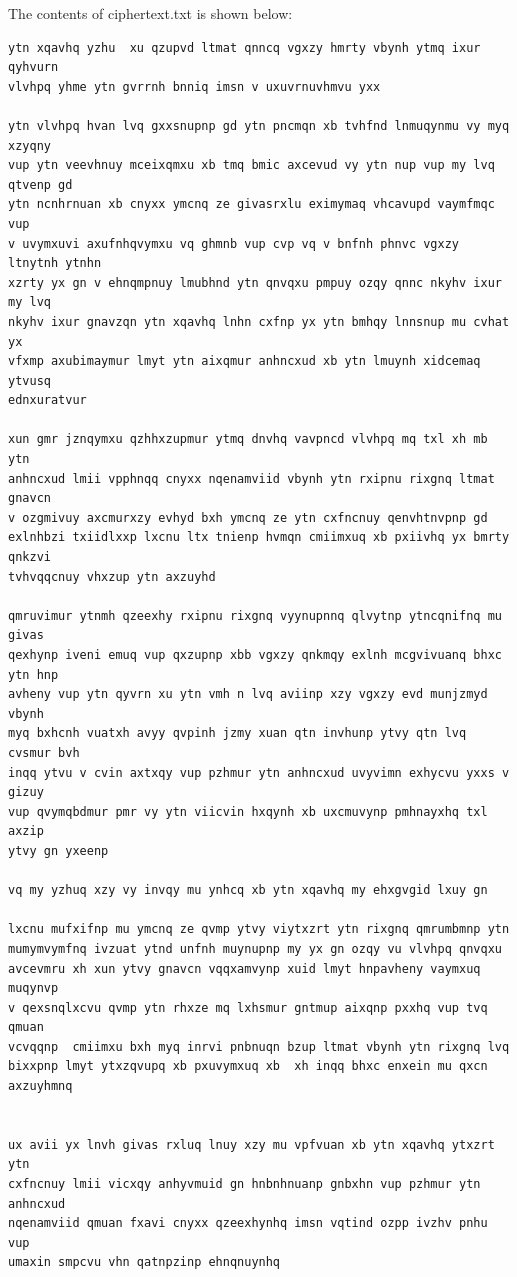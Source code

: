 \documentclass[12pt]{article}
\begin{document}
The contents of ciphertext.txt is shown below:
\begin{verbatim}
ytn xqavhq yzhu  xu qzupvd ltmat qnncq vgxzy hmrty vbynh ytmq ixur qyhvurn
vlvhpq yhme ytn gvrrnh bnniq imsn v uxuvrnuvhmvu yxx

ytn vlvhpq hvan lvq gxxsnupnp gd ytn pncmqn xb tvhfnd lnmuqynmu vy myq xzyqny
vup ytn veevhnuy mceixqmxu xb tmq bmic axcevud vy ytn nup vup my lvq qtvenp gd
ytn ncnhrnuan xb cnyxx ymcnq ze givasrxlu eximymaq vhcavupd vaymfmqc vup
v uvymxuvi axufnhqvymxu vq ghmnb vup cvp vq v bnfnh phnvc vgxzy ltnytnh ytnhn
xzrty yx gn v ehnqmpnuy lmubhnd ytn qnvqxu pmpuy ozqy qnnc nkyhv ixur my lvq
nkyhv ixur gnavzqn ytn xqavhq lnhn cxfnp yx ytn bmhqy lnnsnup mu cvhat yx
vfxmp axubimaymur lmyt ytn aixqmur anhncxud xb ytn lmuynh xidcemaq ytvusq
ednxuratvur

xun gmr jznqymxu qzhhxzupmur ytmq dnvhq vavpncd vlvhpq mq txl xh mb ytn
anhncxud lmii vpphnqq cnyxx nqenamviid vbynh ytn rxipnu rixgnq ltmat gnavcn
v ozgmivuy axcmurxzy evhyd bxh ymcnq ze ytn cxfncnuy qenvhtnvpnp gd 
exlnhbzi txiidlxxp lxcnu ltx tnienp hvmqn cmiimxuq xb pxiivhq yx bmrty qnkzvi
tvhvqqcnuy vhxzup ytn axzuyhd

qmruvimur ytnmh qzeexhy rxipnu rixgnq vyynupnnq qlvytnp ytncqnifnq mu givas
qexhynp iveni emuq vup qxzupnp xbb vgxzy qnkmqy exlnh mcgvivuanq bhxc ytn hnp
avheny vup ytn qyvrn xu ytn vmh n lvq aviinp xzy vgxzy evd munjzmyd vbynh
myq bxhcnh vuatxh avyy qvpinh jzmy xuan qtn invhunp ytvy qtn lvq cvsmur bvh
inqq ytvu v cvin axtxqy vup pzhmur ytn anhncxud uvyvimn exhycvu yxxs v gizuy
vup qvymqbdmur pmr vy ytn viicvin hxqynh xb uxcmuvynp pmhnayxhq txl axzip
ytvy gn yxeenp

vq my yzhuq xzy vy invqy mu ynhcq xb ytn xqavhq my ehxgvgid lxuy gn

lxcnu mufxifnp mu ymcnq ze qvmp ytvy viytxzrt ytn rixgnq qmrumbmnp ytn
mumymvymfnq ivzuat ytnd unfnh muynupnp my yx gn ozqy vu vlvhpq qnvqxu
avcevmru xh xun ytvy gnavcn vqqxamvynp xuid lmyt hnpavheny vaymxuq muqynvp
v qexsnqlxcvu qvmp ytn rhxze mq lxhsmur gntmup aixqnp pxxhq vup tvq qmuan
vcvqqnp  cmiimxu bxh myq inrvi pnbnuqn bzup ltmat vbynh ytn rixgnq lvq
bixxpnp lmyt ytxzqvupq xb pxuvymxuq xb  xh inqq bhxc enxein mu qxcn 
axzuyhmnq


ux avii yx lnvh givas rxluq lnuy xzy mu vpfvuan xb ytn xqavhq ytxzrt ytn
cxfncnuy lmii vicxqy anhyvmuid gn hnbnhnuanp gnbxhn vup pzhmur ytn anhncxud 
nqenamviid qmuan fxavi cnyxx qzeexhynhq imsn vqtind ozpp ivzhv pnhu vup
umaxin smpcvu vhn qatnpzinp ehnqnuynhq


\end{verbatim}
\end{document}
